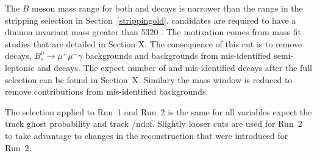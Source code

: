 The $B$ meson mass range for both \bsmumu and \bhh decays is narrower than the range in the stripping selection in Section~\ref{strippingold}. \bsmumu candidates are required to have a dimuon invariant mass greater than 5320 \mevcc. The motivation comes from mass fit studies that are detailed in Section X. The consequence of this cut is to remove \bdmumu decays, $B_{s}^{0} \to \mu^{+} \mu^{-} \gamma$ backgrounds and backgrounds from mis-identified semi-leptonic and \bhh decays. The expect number of \bdmumu and mis-identified decays after the full selection can be found in Section~X. Similary the \bhh mass window is reduced to remove contributions from mis-identified backgrounds. 

The selection applied to Run~1 and Run~2 is the same for all variables expect the track ghost probability and track \chisqd/ndof. Slightly looser cuts are used for Run~2 to take advantage to changes in the reconstruction that were introduced for Run~2. 

